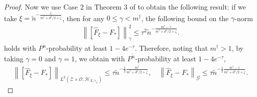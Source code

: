 \documentclass[11pt]{article}
\newcommand{\stageonesamples}{\tilde{n}}
\newcommand{\meffective}{m^{\dag}}
\newcommand{\deffective}{d^{\dag}}
\newcommand{\calZ}{\mathcal{Z}}
\newcommand{\calH}{\mathcal{H}}
\newcommand{\calG}{\mathcal{G}}
\newcommand{\calO}{\mathcal{O}}
\newcommand{\0}{\mathbf{0}}
\begin{document}
\begin{appendix}
\begin{proof}
Now we use Case 2 in Theorem 3 of \cite{JMLR:v25:23-1663} to obtain the following result: if we take $\xi = \stageonesamples^{-\frac{1}{\meffective + \deffective/2 + \zeta}}$, then for any $0\leq \gamma < \meffective$, the following bound on the $\gamma$-norm
\begin{align*}
    \left\|\left[\hat{F}_\xi -F_*\right]\right\|_{\gamma}^2 \leq \tau^2 \stageonesamples^{-\frac{\meffective - \gamma}{\meffective + \deffective/2 + \zeta}} .
\end{align*}
holds with $P^{\tilde{n}}$-probability at least $1 - 4e^{-\tau}$.
Therefore, noting that $\meffective> 1$, by taking $\gamma=0$ and $\gamma=1$, we obtain with  $P^{\tilde{n}}$-probability at least $1 - 4e^{-\tau}$, 
\begin{align*}
    \left\|\left[\hat{F}_\xi -F_*\right]\right\|_{L^2(\calZ\times\calO; \calH_{X,\gamma_x})} \leq \tau \stageonesamples^{-\frac{1}{2}\frac{\meffective}{\meffective + \deffective/2 + \zeta}} , \quad \left\|\hat{F}_\xi -F_*\right\|_{\calG} \leq \tau \stageonesamples^{-\frac{1}{2}\frac{\meffective - 1}{\meffective + \deffective/2 + \zeta}} .
\end{align*}
\end{proof}



\end{appendix}
\end{document}
